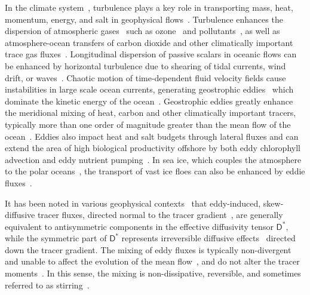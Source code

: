 \documentclass[leqno,onefignum,onetabnum]{siamltex1213}
\newcommand{\Dm}{\mathsf{D}}
\begin{document}
In the climate
system~\cite{Csanady:1973:9789027702609,Griffies:2003:10.1007},
turbulence plays a key role in transporting mass, heat, momentum,
energy, and salt in geophysical
flows~\cite{Moffatt:RPP:621}. Turbulence enhances the dispersion of
atmospheric gases~\cite{Espinosa:MET1292} such as
ozone~\cite{Holton:JGRC2495,Pitari:JGR:1986,Plumb:JAS:1979,Plumb:JAS:1987}
and
pollutants~\cite{Bilger:10.1175,Beychok:1994:9780964458802,Samson:1988:88009978},
as well as atmosphere-ocean transfers of carbon dioxide and other
climatically important trace gas
fluxes~\cite{Zappa:2007:67613,Banerjee:10.1007}.  Longitudinal
dispersion of passive scalars in oceanic flows can be enhanced by
horizontal turbulence due to shearing of tidal currents, wind drift,
or
waves~\cite{Young:JPO:1982:515,Kullenberg:1972:TUS1529,Bowden:JFM:1965}.   
Chaotic motion of 
time-dependent fluid velocity fields cause instabilities in large
scale ocean currents, generating geostrophic
eddies~\cite{Ferrari:JPO:1501} which dominate the kinetic energy of
the ocean~\cite{Ferrari:ARFM:253}. Geostrophic
eddies greatly enhance~\cite{Ferrari:JPO:1501} the meridional mixing
of heat, carbon and other climatically important tracers, typically
more than one order of magnitude greater than the mean flow of the
ocean~\cite{Souza:OS:317}. Eddies also impact heat and salt budgets
through lateral fluxes and can extend the area of high biological
productivity offshore by both eddy chlorophyll advection and eddy
nutrient pumping~\cite{Chaigneau:JGR:C11025}. In sea ice, which
couples the atmosphere to the polar
oceans~\cite{Washington:1986:9780935702521}, the transport of vast ice
floes can also be enhanced by eddie
fluxes~\cite{Watanabe:2009JPO4010,Lukovich:Sea_ice_dynamics}. 







It has been noted in various geophysical
contexts~\cite{Plumb:JAS:1979,Plumb:JAS:1987} that eddy-induced,
skew-diffusive tracer fluxes, directed normal to the tracer
gradient~\cite{Middleton:JPO:5840223}, are generally equivalent to
antisymmetric components in the effective 
diffusivity tensor $\Dm^*$, while the symmetric part of $\Dm^*$
represents irreversible diffusive
effects~\cite{Redi:JPO:1982:1154,Solomon:OGR:1971:233,Griffies:JPO:1998}
directed down the tracer gradient. The mixing of eddy fluxes is
typically non-divergent and unable to affect the evolution of the mean
flow~\cite{Middleton:JPO:5840223}, and do not alter the tracer
moments~\cite{Griffies:JPO:1998}. In this sense, the 
mixing is non-dissipative, reversible, and sometimes referred to as
stirring~\cite{Eckart:JMR:1948,Griffies:JPO:1998}.  
\end{document}
